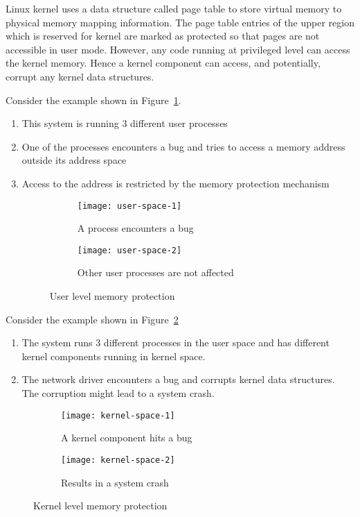 Linux kernel uses a data structure called page table to store virtual 
memory to physical memory mapping information. The page table entries of the upper region 
which is reserved for kernel are marked as protected so that pages are not accessible in user mode. 
However, any code running at privileged level can access the kernel memory. Hence a kernel component can access, 
and potentially, corrupt any kernel data structures.

Consider the example shown in Figure~\ref{fig:User space}.
\begin{enumerate}
\item This system is running 3 different user processes
\item One of the processes encounters a bug and tries to access a memory address outside its address space
\item Access to the address is restricted by the memory protection mechanism
\begin{figure}[!ht]
    \centering
    \begin{subfigure}[b]{0.49\textwidth}
	\texttt{[image: user-space-1]}
	\caption{A process encounters a bug}
    \end{subfigure}
	\hfill
    \begin{subfigure}[b]{0.49\textwidth}
	\texttt{[image: user-space-2]}
	\caption{Other user processes are not affected}
    \end{subfigure}
    \caption{User level memory protection}\label{fig:User space}
\end{figure}
\end{enumerate}

Consider the example shown in Figure~\ref{fig:Kernel space}
\begin{enumerate}
\item The system runs 3 different processes in the user space and has
different kernel components running in kernel space.

\item The network driver encounters a bug and corrupts kernel data
structures. The corruption might lead to a system crash.

\end{enumerate}
\begin{figure}[!ht]
    \centering
    \begin{subfigure}[b]{0.49\textwidth}
	\texttt{[image: kernel-space-1]}
	\caption{A kernel component hits a bug}
    \end{subfigure}
	\hfill
    \begin{subfigure}[b]{0.49\textwidth}
	\texttt{[image: kernel-space-2]}
	\caption{Results in a system crash}
    \end{subfigure}
    \caption{Kernel level memory protection}\label{fig:Kernel space}
\end{figure}

